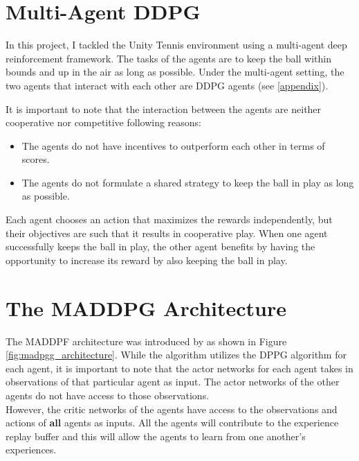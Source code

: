 \documentclass[12pt,twoside]{article}
\begin{document}



\section{Multi-Agent DDPG}
In this project, I tackled the Unity Tennis environment using a multi-agent deep reinforcement framework. The tasks of the agents are to keep the ball within bounds and up in the air as long as possible. Under the multi-agent setting, the two agents that interact with each other are DDPG agents (see \ref{appendix}). 

It is important to note that the interaction between the agents are neither cooperative nor competitive following reasons:
\begin{itemize}
	\item The agents do not have incentives to outperform each other in terms of scores.
	\item The agents do not formulate a shared strategy to keep the ball in play as long as possible.
\end{itemize}

Each agent chooses an action that maximizes the rewards independently, but their objectives are such that it results in cooperative play. When one agent successfully keeps the ball in play, the other agent benefits by having the opportunity to increase its reward by also keeping the ball in play.


\section{The MADDPG Architecture}
The MADDPF architecture was introduced by \citep{lowe2017multi} as shown in Figure \ref{fig:madpgg_architecture}. While the algorithm utilizes the DPPG algorithm for each agent, it is important to note that the actor networks for each agent takes in observations of that particular agent as input. The actor networks of the other agents do not have access to those observations. \\

However, the critic networks of the agents have access to the observations and actions of \textbf{all} agents as inputs. All the agents will contribute to the experience replay buffer and this will allow the agents to learn from one another's experiences.
\end{document}
